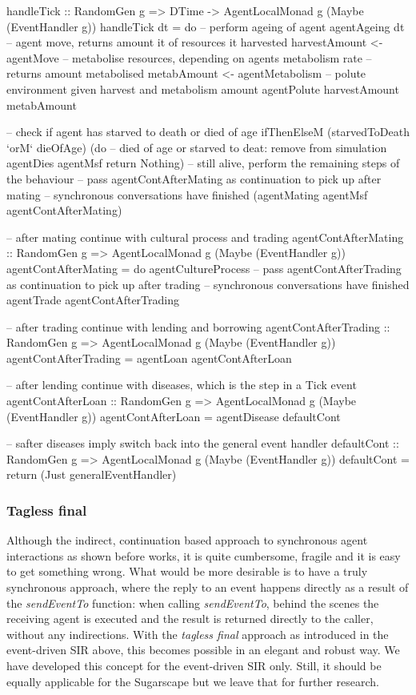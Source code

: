 \begin{HaskellCode}
handleTick :: RandomGen g => DTime -> AgentLocalMonad g (Maybe (EventHandler g))
handleTick dt = do
  -- perform ageing of agent
  agentAgeing dt
  -- agent move, returns amount it of resources it harvested
  harvestAmount <- agentMove
  -- metabolise resources, depending on agents metabolism rate
  -- returns amount metabolised
  metabAmount <- agentMetabolism
  -- polute environment given harvest and metabolism amount
  agentPolute harvestAmount metabAmount

  -- check if agent has starved to death or died of age
  ifThenElseM
    (starvedToDeath `orM` dieOfAge)
    (do
      -- died of age or starved to deat: remove from simulation
      agentDies agentMsf
      return Nothing) 
    -- still alive, perform the remaining steps of the behaviour
    -- pass agentContAfterMating as continuation to pick up after mating
    -- synchronous conversations have finished
    (agentMating agentMsf agentContAfterMating)

-- after mating continue with cultural process and trading
agentContAfterMating :: RandomGen g => AgentLocalMonad g (Maybe (EventHandler g))
agentContAfterMating = do
    agentCultureProcess
    -- pass agentContAfterTrading as continuation to pick up after trading 
    -- synchronous conversations have finished
    agentTrade agentContAfterTrading 

-- after trading continue with lending and borrowing
agentContAfterTrading :: RandomGen g  => AgentLocalMonad g (Maybe (EventHandler g))
agentContAfterTrading = agentLoan agentContAfterLoan

-- after lending continue with diseases, which is the step in a Tick event
agentContAfterLoan :: RandomGen g => AgentLocalMonad g (Maybe (EventHandler g))
agentContAfterLoan = agentDisease defaultCont

-- safter diseases imply switch back into the general event handler
defaultCont :: RandomGen g => AgentLocalMonad g (Maybe (EventHandler g))
defaultCont = return (Just generalEventHandler)
\end{HaskellCode}

\subsubsection{Tagless final}
Although the indirect, continuation based approach to synchronous agent interactions as shown before works, it is quite cumbersome, fragile and it is easy to get something wrong. What would be more desirable is to have a truly synchronous approach, where the reply to an event happens directly as a result of the \textit{sendEventTo} function: when calling \textit{sendEventTo}, behind the scenes the receiving agent is executed and the result is returned directly to the caller, without any indirections. With the \textit{tagless final} approach as introduced in the event-driven SIR above, this becomes possible in an elegant and robust way. We have developed this concept for the event-driven SIR only. Still, it should be equally applicable for the Sugarscape but we leave that for further research.

